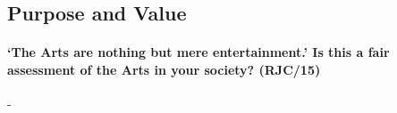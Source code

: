 \documentclass[../../main]{subfiles}
\begin{document}
\subsection{Purpose and Value}

\paragraph{`The Arts are nothing but mere entertainment.' Is this a fair assessment of the Arts in your society? (RJC/15)}-
\end{document}
